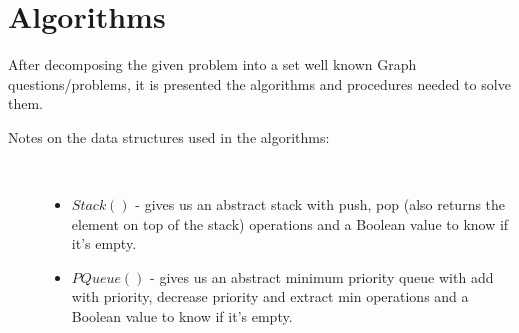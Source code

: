 \documentclass{article}
\begin{document}
\section{Algorithms}
After decomposing the given problem into a set well known Graph questions/problems, it is presented the algorithms and procedures needed to solve them.
\begin{description}
\item[Notes on the data structures used in the algorithms:]\
\begin{itemize}
    \item $Stack()$ - gives us an abstract stack with push, pop (also returns the element on top of the stack) operations and a Boolean value to know if it’s empty.
    \item $PQueue()$ - gives us an abstract minimum priority queue with add with priority, decrease priority and extract min operations and a Boolean value to know if it's empty.
\end{itemize}
\end{description}
\end{document}
